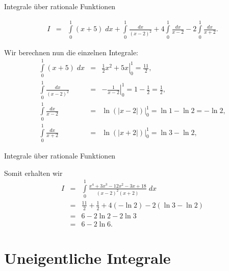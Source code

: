 \documentclass[german]{beamer}
\newcommand{\bq}{\begin{eqnarray*}}
\newcommand{\eq}{\end{eqnarray*}}
\begin{document}
\begin{frame}{Integrale \"uber rationale Funktionen}

{\footnotesize
\bq
 I & = & 
 \int\limits_0^1 \left( x + 5 \right) \; dx 
 + \int\limits_0^1 \frac{dx}{(x-2)^2} 
 + 4 \int\limits_0^1 \frac{dx}{x-2} 
 - 2 \int\limits_0^1 \frac{dx}{x+2}.
\eq
}

Wir berechnen nun die einzelnen Integrale:
{\footnotesize
\bq
 \int\limits_0^1 \left( x + 5 \right) \; dx & = & 
 \left. \frac{1}{2} x^2 + 5 x \right|_0^1 = \frac{11}{2},
 \nonumber \\
 \int\limits_0^1 \frac{dx}{(x-2)^2} & = & \left. - \frac{1}{x-2} \right|_0^1 = 1 - \frac{1}{2} = \frac{1}{2},
 \nonumber \\
 \int\limits_0^1 \frac{dx}{x-2} & = & \left. \ln\left(|x-2|\right) \right|_0^1 = \ln 1 - \ln 2 = -\ln 2,
 \nonumber \\
 \int\limits_0^1 \frac{dx}{x+2} & = & \left. \ln\left(|x+2|\right) \right|_0^1 = \ln 3 -\ln 2,
\eq
}

\end{frame}

\begin{frame}{Integrale \"uber rationale Funktionen}

Somit erhalten wir
\bq
 I & = & \int\limits_0^1 \frac{x^4+3x^3-12x^2-3x+18}{(x-2)^2(x+2)} \; dx
 \nonumber \\
 & = & 
 \frac{11}{2} + \frac{1}{2} + 4 \left( - \ln 2 \right) - 2 \left( \ln 3 - \ln 2 \right)
 \nonumber \\
 & = & 
 6 - 2 \ln 2 - 2 \ln 3 
 \nonumber \\
 & = & 
 6 -2 \ln 6.
\eq
\end{frame}


\section{Uneigentliche Integrale}

\frame{\sectionpage}
\end{document}
